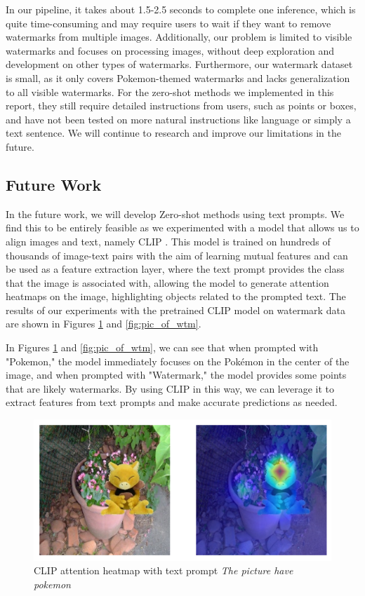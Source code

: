 
In our pipeline, it takes about 1.5-2.5 seconds to complete one inference, which is quite time-consuming and may require users to wait if they want to remove watermarks from multiple images. Additionally, our problem is limited to visible watermarks and focuses on processing images, without deep exploration and development on other types of watermarks. Furthermore, our watermark dataset is small, as it only covers Pokemon-themed watermarks and lacks generalization to all visible watermarks. For the zero-shot methods we implemented in this report, they still require detailed instructions from users, such as points or boxes, and have not been tested on more natural instructions like language or simply a text sentence. We will continue to research and improve our limitations in the future. 


\subsection{Future Work}
In the future work, we will develop Zero-shot methods using text prompts. We find this to be entirely feasible as we experimented with a model that allows us to align images and text, namely CLIP \cite{radford2021learning}. This model is trained on hundreds of thousands of image-text pairs with the aim of learning mutual features and can be used as a feature extraction layer, where the text prompt provides the class that the image is associated with, allowing the model to generate attention heatmaps on the image, highlighting objects related to the prompted text. The results of our experiments with the pretrained CLIP model on watermark data are shown in Figures \ref{fig:pic_of_pokemon} and \ref{fig:pic_of_wtm}.

In Figures \ref{fig:pic_of_pokemon} and \ref{fig:pic_of_wtm}, we can see that when prompted with "Pokemon," the model immediately focuses on the Pokémon in the center of the image, and when prompted with "Watermark," the model provides some points that are likely watermarks. By using CLIP in this way, we can leverage it to extract features from text prompts and make accurate predictions as needed.
\begin{figure}[t]
    \centering
    \includegraphics[width=0.75\linewidth]{img/pic_of_pokemon.png}
    \caption{CLIP attention heatmap with text prompt \textit{The picture have pokemon}}
    \label{fig:pic_of_pokemon}
\end{figure}

